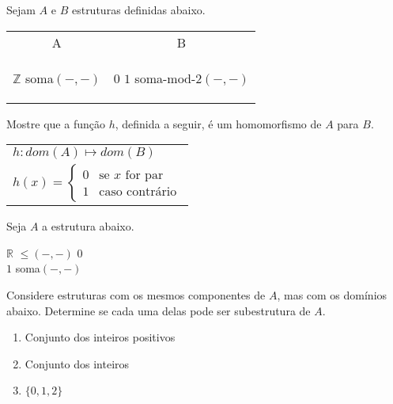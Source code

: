 \begin{exercises}
    \begin{question}
        Sejam $A$ e $B$ estruturas definidas abaixo.
        \begin{center}
            \begin{tabular}{c c}
                A & B \\
                \begin{structure}
                    {$\mathbb{Z}$}
                    {}
                    {}
                    {}
                    {soma$(-,-)$}
                \end{structure}
                &
                \begin{structure}
                    {}
                    {$0$ $1$}
                    {}
                    {}
                    {soma-mod-2$(-,-)$} 
                \end{structure}
            \end{tabular}
        \end{center}

        Mostre que a função $h$, definida a seguir, é um homomorfismo de $A$ para $B$.
        \begin{center}
            \begin{tabular}{l}
            $h: dom(A) \mapsto dom(B)$ \\
            $h(x) = \begin{cases}
                0 & \text{se $x$ for par} \\
                1 & \text{caso contrário}
            \end{cases}$
            \end{tabular}
        \end{center}
    \end{question}

    \begin{question}
        Seja $A$ a estrutura abaixo.
        \begin{center}
            \begin{structure}
                {$\mathbb{R}$}
                {}
                {$\leq$$(-,-)$}
                {$0$\\$1$}
                {soma$(-,-)$}
            \end{structure}
        \end{center}
        Considere estruturas com os mesmos componentes de $A$, mas com os domínios abaixo. Determine se cada uma delas pode ser subestrutura de $A$.
        \begin{enumerate}
            \item Conjunto dos inteiros positivos
            \item Conjunto dos inteiros
            \item $\{0, 1, 2\}$
        \end{enumerate}
    \end{question}


\end{exercises}
